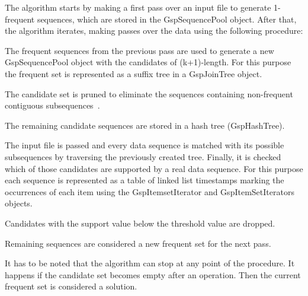 \documentclass[journal,a4paper]{IEEEtran}
\newenvironment{my_itemize}{
\begin{itemize}
  \setlength{\itemsep}{4pt}
  \setlength{\parskip}{1pt}
  \setlength{\parsep}{4pt}}
{\end{itemize}
}
\begin{document}
The algorithm starts by making a first pass over an input file to generate 1-frequent sequences, which are stored in the GspSequencePool object. After that, the algorithm iterates, making passes over the data using the following procedure:

\begin{my_itemize}
\item The frequent sequences from the previous pass are used to generate a new GspSequencePool object with the candidates of (k+1)-length. For this purpose the frequent set is represented as a suffix tree in a GspJoinTree object.
\item The candidate set is pruned to eliminate the sequences containing non-frequent contiguous subsequences~\cite{gsp}.
\item The remaining candidate sequences are stored in a hash tree (GspHashTree).
\item The input file is passed and every data sequence is matched with its possible subsequences by traversing the previously created tree. Finally, it is checked which of those candidates are supported by a real data sequence. For this purpose each sequence is represented as a table of linked list timestamps marking the occurrences of each item using the GspItemsetIterator and GspItemSetIterators objects.
\item Candidates with the support value below the threshold value are dropped.
\item Remaining sequences are considered a new frequent set for the next pass.
\end{my_itemize}

It has to be noted that the algorithm can stop at any point of the procedure. It happens if the candidate set becomes empty after an operation. Then the current frequent set is considered a solution.
\end{document}
